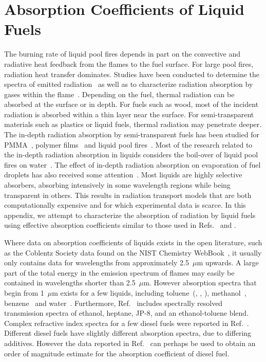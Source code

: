 \chapter{Absorption Coefficients of Liquid Fuels}
\label{app_abscoeff}

The burning rate of liquid pool fires depends in part on the convective and radiative heat feedback from the flames to the fuel surface. For large pool fires, radiation heat transfer dominates. Studies have been conducted to determine the spectra of emitted radiation~\cite{Suo-Anttila:PCT2009} as well as to characterize radiation absorption by gases within the flame~\cite{Wakatsuki:CST2008}. Depending on the fuel, thermal radiation can be absorbed at the surface or in depth. For fuels such as wood, most of the incident radiation is absorbed within a thin layer near the surface. For semi-transparent materials such as plastics or liquid fuels, thermal radiation may penetrate deeper. The in-depth radiation absorption by semi-transparent fuels has been studied for PMMA~\cite{Stoliarov:CF2009}, polymer films~\cite{Tsilingiris:ECM2003} and liquid pool fires~\cite{Suo-Anttila:PCT2009}. Most of the research related to the in-depth radiation absorption in liquids considers the boil-over of liquid pool fires on water~\cite{Broeckmann:JLPPI1995}. The effect of in-depth radiation absorption on evaporation of fuel droplets has also received some attention~\cite{Sazhin:IJHMT2004b}. Most liquids are highly selective absorbers, absorbing intensively in some wavelength regions while being transparent in others. This results in radiation transport models that are both computationally expensive and for which experimental data is scarce. In this appendix, we attempt to characterize the absorption of radiation by liquid fuels using effective absorption coefficients similar to those used in Refs.~\cite{Madhav:IJMP1995} and \cite{Manohar:JHT1995}.

Where data on absorption coefficients of liquids exists in the open literature, such as the Coblentz Society data found on the NIST Chemistry WebBook~\cite{Coblentz:1}, it usually  only contains data for wavelengths from approximately 2.5~$\mu$m upwards. A large part of the total energy in the emission spectrum of flames may easily be contained in wavelengths shorter than 2.5~$\mu$m. However absorption spectra that begin from 1~$\mu$m exists for a few liquids, including toluene~(\cite{Bertie:JMS2005}, \cite{Bertie:AS1994b}, \cite{Bertie:AS1994a}), methanol~\cite{Bertie:AS1993a}, benzene~\cite{Bertie:AS1993b} and water~\cite{Bertie:AS1996}. Furthermore, Ref.~\cite{Suo-Anttila:PCT2009} includes spectrally resolved transmission spectra of ethanol, heptane, JP-8, and an ethanol-toluene blend. Complex refractive index spectra for a few diesel fuels were reported in Ref.~\cite{Sazhin:IJHMT2004b}. Different diesel fuels have slightly different absorption spectra, due to differing additives. However the data reported in Ref.~\cite{Sazhin:IJHMT2004b} can perhaps be used to obtain an order of magnitude estimate for the absorption coefficient of diesel fuel.

